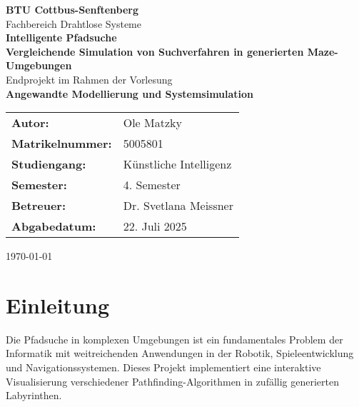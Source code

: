\documentclass[12pt,a4paper]{article}
\begin{document}
\begin{titlepage}
    \centering
    \vspace*{2cm}
    
    {\LARGE\textbf{BTU Cottbus-Senftenberg}}\\[0.5cm]
    {\Large Fachbereich Drahtlose Systeme}\\[2cm]
    
    {\huge\textbf{Intelligente Pfadsuche}}\\[0.5cm]
    {\LARGE\textbf{Vergleichende Simulation von Suchverfahren in generierten Maze-Umgebungen}}\\[3cm]
    
    {\Large Endprojekt im Rahmen der Vorlesung}\\[0.3cm]
    {\Large\textbf{Angewandte Modellierung und Systemsimulation}}\\[2cm]
    
    \begin{tabular}{ll}
        \textbf{Autor:} & Ole Matzky\\[0.3cm]
        \textbf{Matrikelnummer:} & 5005801 \\[0.3cm]
        \textbf{Studiengang:} & Künstliche Intelligenz \\[0.3cm]
        \textbf{Semester:} & 4. Semester \\[0.3cm]
        \textbf{Betreuer:} & Dr. Svetlana Meissner \\[0.3cm]
        \textbf{Abgabedatum:} & 22. Juli 2025 \\
    \end{tabular}
    
    \vfill
    
    {\large\today}
\end{titlepage}

\tableofcontents
\newpage

\section{Einleitung}

Die Pfadsuche in komplexen Umgebungen ist ein fundamentales Problem der Informatik mit weitreichenden Anwendungen in der Robotik, Spieleentwicklung und Navigationssystemen. Dieses Projekt implementiert eine interaktive Visualisierung verschiedener Pathfinding-Algorithmen in zufällig generierten Labyrinthen.
\end{document}

